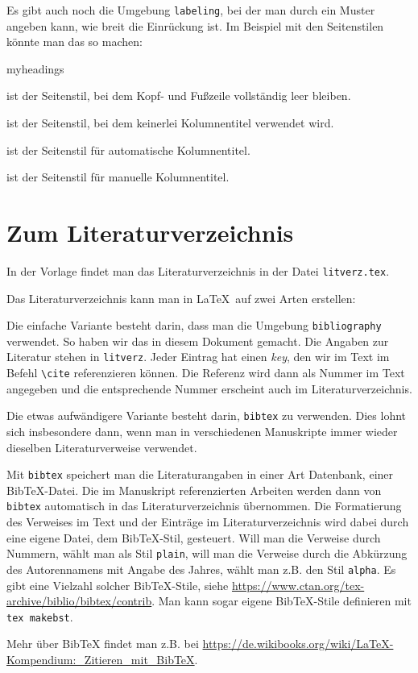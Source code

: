 Es gibt auch noch die Umgebung \verb=labeling=, bei der man durch ein
Muster angeben kann, wie breit die Einrückung ist. Im Beispiel mit den
Seitenstilen könnte man das so machen:

\begin{labeling}{myheadings}
	\item[empty] ist der Seitenstil, bei dem Kopf- und Fußzeile vollständig 
		leer bleiben. 
	\item[plain] ist der Seitenstil, bei dem keinerlei Kolumnentitel verwendet wird. 
	\item[headings] ist der Seitenstil für automatische Kolumnentitel. 
	\item[myheadings] ist der Seitenstil für manuelle Kolumnentitel. 
\end{labeling}

\section{Zum Literaturverzeichnis}

In der Vorlage findet man das Literaturverzeichnis in der Datei
\verb=litverz.tex=. 

Das Literaturverzeichnis kann man in \LaTeX\ auf zwei Arten erstellen:

Die einfache Variante besteht darin, dass man die Umgebung
\verb=bibliography= verwendet. So haben wir das in diesem Dokument
gemacht. Die Angaben zur Literatur stehen in \verb=litverz=. Jeder
Eintrag hat einen \emph{key}, den wir im Text im Befehl \verb=\cite=
referenzieren können. Die Referenz wird dann als Nummer im Text
angegeben und die entsprechende Nummer erscheint auch im
Literaturverzeichnis.

Die etwas aufwändigere Variante besteht darin, \verb=bibtex= zu
verwenden. Dies lohnt sich insbesondere dann, wenn man in verschiedenen
Manuskripte immer wieder dieselben Literaturverweise verwendet.

Mit \verb=bibtex= speichert man die Literaturangaben in einer Art
Datenbank, einer BibTeX-Datei. Die im Manuskript referenzierten Arbeiten
werden dann von \verb=bibtex= automatisch in das Literaturverzeichnis
übernommen. Die Formatierung des Verweises im Text und der Einträge im
Literaturverzeichnis wird dabei durch eine eigene Datei, dem
BibTeX-Stil, gesteuert. Will man die Verweise durch Nummern, wählt man
als Stil \verb=plain=, will man die Verweise durch die Abkürzung des
Autorennamens mit Angabe des Jahres, wählt man z.B. den Stil
\verb=alpha=. Es gibt eine Vielzahl solcher BibTeX-Stile, siehe
\url{https://www.ctan.org/tex-archive/biblio/bibtex/contrib}. Man kann sogar
eigene BibTeX-Stile definieren mit \verb=tex makebst=.

Mehr über BibTeX findet man z.B. bei \url{https://de.wikibooks.org/wiki/LaTeX-Kompendium:_Zitieren_mit_BibTeX}.


